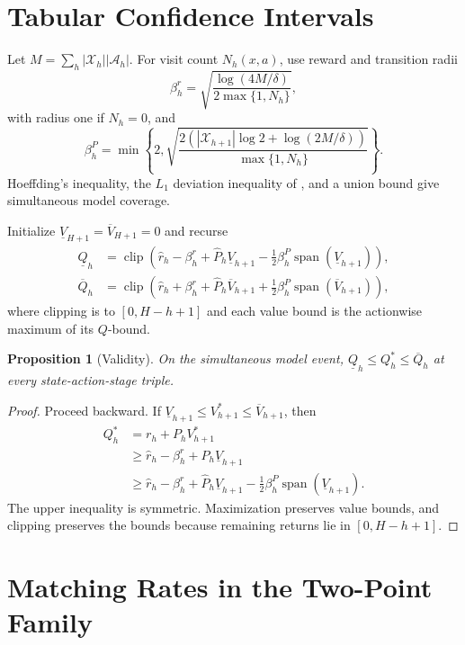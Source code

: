 \documentclass[letterpaper]{article} %
\newtheorem{proposition}{Proposition}
\newcommand{\spanop}{\operatorname{span}}
\begin{document}
\section{Tabular Confidence Intervals}

Let \(M=\sum_h|\mathcal X_h||\mathcal A_h|\).  For visit count \(N_h(x,a)\),
use reward and transition radii
\[
\beta_h^r=\sqrt{\frac{\log(4M/\delta)}{2\max\{1,N_h\}}},
\]
with radius one if \(N_h=0\), and
\[
\beta_h^P=\min\left\{2,
\sqrt{\frac{2(|\mathcal X_{h+1}|\log2+\log(2M/\delta))}
{\max\{1,N_h\}}}\right\}.
\]
Hoeffding's inequality, the \(L_1\) deviation inequality of
\citet{weissman2003l1}, and a union bound give simultaneous model coverage.

Initialize \(\underline V_{H+1}=\overline V_{H+1}=0\) and recurse
\[
\begin{aligned}
\underline Q_h&=\operatorname{clip}\left(
\widehat r_h-\beta_h^r+\widehat P_h\underline V_{h+1}
-\tfrac12\beta_h^P\spanop(\underline V_{h+1})\right),\\
\overline Q_h&=\operatorname{clip}\left(
\widehat r_h+\beta_h^r+\widehat P_h\overline V_{h+1}
+\tfrac12\beta_h^P\spanop(\overline V_{h+1})\right),
\end{aligned}
\]
where clipping is to \([0,H-h+1]\) and each value bound is the actionwise
maximum of its \(Q\)-bound.

\begin{proposition}[Validity]
On the simultaneous model event,
\(\underline Q_h\leq Q_h^*\leq\overline Q_h\) at every state-action-stage
triple.
\end{proposition}
\begin{proof}
Proceed backward.  If
\(\underline V_{h+1}\leq V_{h+1}^*\leq\overline V_{h+1}\), then
\[
\begin{aligned}
Q_h^*&=r_h+P_hV_{h+1}^*\\
&\geq \widehat r_h-\beta_h^r
 +P_h\underline V_{h+1}\\
&\geq \widehat r_h-\beta_h^r
 +\widehat P_h\underline V_{h+1}
 -\tfrac12\beta_h^P\spanop(\underline V_{h+1}).
\end{aligned}
\]
The upper inequality is symmetric.  Maximization preserves value bounds, and
clipping preserves the bounds because remaining returns lie in
\([0,H-h+1]\).
\end{proof}

\section{Matching Rates in the Two-Point Family}
\end{document}
